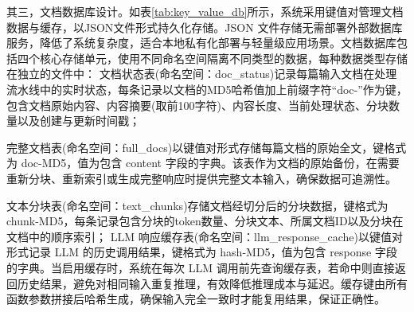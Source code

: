 \documentclass[promaster, vlined]{DissertUESTC}
\begin{document}
其三，文档数据库设计。如表\ref{tab:key_value_db}所示，系统采用键值对管理文档数据与缓存，以JSON文件形式持久化存储。JSON 文件存储无需部署外部数据库服务，降低了系统复杂度，适合本地私有化部署与轻量级应用场景。文档数据库包括四个核心存储单元，使用不同命名空间隔离不同类型的数据，每种数据类型存储在独立的文件中：
文档状态表(命名空间：doc\_status)记录每篇输入文档在处理流水线中的实时状态，每条记录以文档的MD5哈希值加上前缀字符“doc-”作为键，包含文档原始内容、内容摘要(取前100字符)、内容长度、当前处理状态、分块数量以及创建与更新时间戳；

完整文档表(命名空间：full\_docs)以键值对形式存储每篇文档的原始全文，键格式为 doc-{MD5}，值为包含 content 字段的字典。该表作为文档的原始备份，在需要重新分块、重新索引或生成完整响应时提供完整文本输入，确保数据可追溯性。

文本分块表(命名空间：text\_chunks)存储文档经切分后的分块数据，键格式为 chunk-{MD5}，每条记录包含分块的token数量、分块文本、所属文档ID以及分块在文档中的顺序索引；
LLM 响应缓存表(命名空间：llm\_response\_cache)以键值对形式记录 LLM 的历史调用结果，键格式为 hash-{MD5}，值为包含 response 字段的字典。当启用缓存时，系统在每次 LLM 调用前先查询缓存表，若命中则直接返回历史结果，避免对相同输入重复推理，有效降低推理成本与延迟。缓存键由所有函数参数拼接后哈希生成，确保输入完全一致时才能复用结果，保证正确性。
\end{document}
